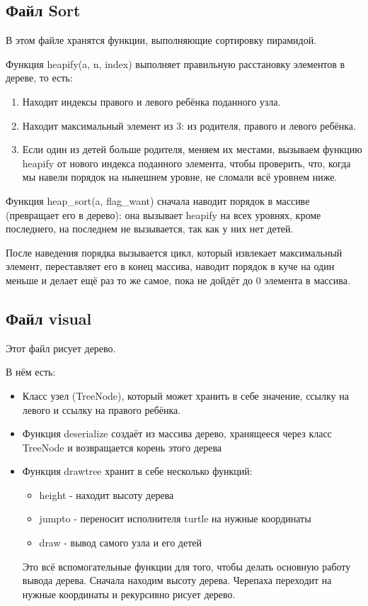 \documentclass{article}
\begin{document}
\subsection{Файл Sort}

В этом файле хранятся функции, выполняющие сортировку пирамидой.

Функция heapify(a, n, index) выполняет правильную расстановку элементов в дереве, то есть:

\begin{enumerate}
    \item Находит индексы правого и левого ребёнка поданного узла.
    \item Находит максимальный элемент из 3: из родителя, правого и левого ребёнка.
    \item Если один из детей больше родителя, меняем их местами, вызываем функцию heapify от нового индекса поданного элемента, чтобы проверить, что, когда мы навели порядок на нынешнем уровне, не сломали всё уровнем ниже.
\end{enumerate}

Функция heap\_sort(a, flag\_want) сначала наводит порядок в массиве (превращает его в дерево): она вызывает heapify на всех уровнях, кроме последнего, на последнем не вызывается, так как у них нет детей.

После наведения порядка вызывается цикл, который извлекает максимальный элемент, переставляет его в конец массива, наводит порядок в куче на один меньше и делает ещё раз то же самое, пока не дойдёт до 0 элемента в массива.

\subsection{Файл visual}

Этот файл рисует дерево. 

В нём есть:

\begin{itemize}
    \item Класс узел (TreeNode), который может хранить в себе значение, ссылку на левого и ссылку на правого ребёнка. 
    \item Функция deserialize создаёт из массива дерево, хранящееся через класс TreeNode и возвращается корень этого дерева
    \item Функция drawtree хранит в себе несколько функций:
        \begin{itemize}
            \item height - находит высоту дерева
            \item jumpto - переносит исполнителя turtle на нужные координаты
            \item draw - вывод самого узла и его детей
        \end{itemize}
        Это всё вспомогательные функции для того, чтобы делать основную работу вывода дерева. Сначала находим высоту дерева. Черепаха переходит на нужные координаты и рекурсивно рисует дерево.
\end{itemize}
\end{document}
